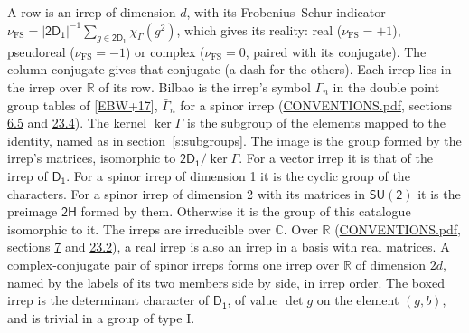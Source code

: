 \documentclass[10pt,a4paper]{article}
\numberwithin{equation}{section}
\newcommand{\grp}[1]{\mathsf{#1}}
\newcommand{\irchar}[1]{\chi_{#1}}
\newcommand{\fsind}{\nu_{\mathrm{FS}}}
\begin{document}
\leavevmode\label{n:index.frobenius}\label{n:head.irrep}\label{n:head.reality}A row is an irrep of dimension $d$, with its Frobenius--Schur indicator $\fsind = |\grp{2D_{1}}|^{-1}\allowbreak\sum_{g\in\grp{2D_{1}}}\irchar{\Gamma}(g^2)$, which gives its reality: real ($\fsind = +1$), pseudoreal ($\fsind = -1$) or complex ($\fsind = 0$, paired with its conjugate). \label{n:head.conjugate}The column conjugate gives that conjugate (a dash for the others). \label{n:head.over.real}Each irrep lies in the irrep over $\mathbb{R}$ of its row. \label{n:head.bilbao}\label{n:irrep.alias.gamma}Bilbao is the irrep's symbol $\Gamma_n$ in the double point group tables of [\href{../../../REFERENCES.pdf\#ref.EBW+17}{EBW+17}], $\bar{\Gamma}_n$ for a spinor irrep (\href{../../CONVENTIONS.pdf}{CONVENTIONS.pdf}, sections \href{../../../rotation/CONVENTIONS.pdf\#conv.6.5}{6.5} and \href{../../CONVENTIONS.pdf\#conv.23.4}{23.4}). \label{n:head.kernel}The kernel $\ker\Gamma$ is the subgroup of the elements mapped to the identity, named as in section~\ref{s:subgroups}. \label{n:head.image}The image is the group formed by the irrep's matrices, isomorphic to $\grp{2D_{1}}/\ker\Gamma$. For a vector irrep it is that of the irrep of \href{../../../rotation/data/pdf/D1.pdf}{$\grp{D_{1}}$}. For a spinor irrep of dimension 1 it is the cyclic group of the characters. For a spinor irrep of dimension 2 with its matrices in $\grp{SU(2)}$ it is the preimage $\grp{2H}$ formed by them. Otherwise it is the group of this catalogue isomorphic to it. The irreps are irreducible over $\mathbb{C}$. Over $\mathbb{R}$ (\href{../../CONVENTIONS.pdf}{CONVENTIONS.pdf}, sections \href{../../../rotation/CONVENTIONS.pdf\#conv.7}{7} and \href{../../CONVENTIONS.pdf\#conv.23.2}{23.2}), a real irrep is also an irrep in a basis with real matrices. A complex-conjugate pair of spinor irreps forms one irrep over $\mathbb{R}$ of dimension $2d$, named by the labels of its two members side by side, in irrep order. \label{n:mark.determinant}The boxed irrep is the determinant character of \href{../../../rotation/data/pdf/D1.pdf}{$\grp{D_{1}}$}, of value $\det g$ on the element $(g, b)$, and is trivial in a group of type I.
\setlength{\emergencystretch}{2em}\par\setlength{\emergencystretch}{0pt}
\end{document}
